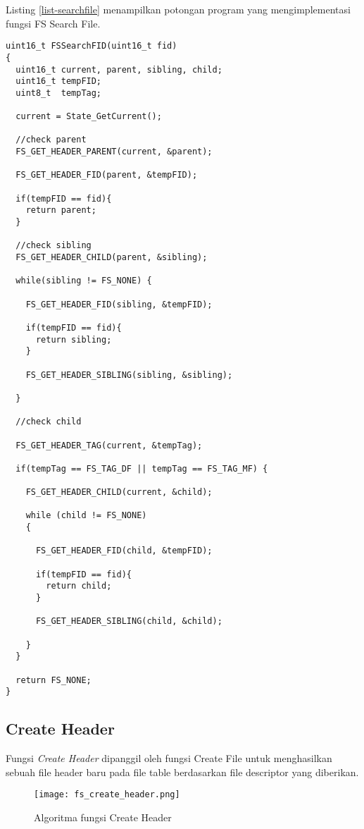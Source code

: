 Listing \ref{list-searchfile} menampilkan potongan program yang mengimplementasi fungsi FS Search File.

\begin{lstlisting}[caption={Listing Program Fungsi FS Search File}, label={list-searchfile}]
uint16_t FSSearchFID(uint16_t fid)
{
  uint16_t current, parent, sibling, child;
  uint16_t tempFID;
  uint8_t  tempTag;

  current = State_GetCurrent();

  //check parent
  FS_GET_HEADER_PARENT(current, &parent);

  FS_GET_HEADER_FID(parent, &tempFID);

  if(tempFID == fid){
    return parent;
  }

  //check sibling
  FS_GET_HEADER_CHILD(parent, &sibling);

  while(sibling != FS_NONE) {

    FS_GET_HEADER_FID(sibling, &tempFID);

    if(tempFID == fid){
      return sibling;
    }

    FS_GET_HEADER_SIBLING(sibling, &sibling);

  }

  //check child

  FS_GET_HEADER_TAG(current, &tempTag);

  if(tempTag == FS_TAG_DF || tempTag == FS_TAG_MF) {

    FS_GET_HEADER_CHILD(current, &child);

    while (child != FS_NONE)
    {

      FS_GET_HEADER_FID(child, &tempFID);

      if(tempFID == fid){
        return child;
      }

      FS_GET_HEADER_SIBLING(child, &child);

    }
  }

  return FS_NONE;
}
\end{lstlisting}


\subsection{Create Header}

Fungsi {\em Create Header} dipanggil oleh fungsi Create File untuk menghasilkan sebuah file header baru pada file table berdasarkan file descriptor yang diberikan. 

\begin{figure}
\centering
\texttt{[image: fs\_create\_header.png]}
\caption{Algoritma fungsi Create Header}
\label{fig-create-header}
\end{figure}

